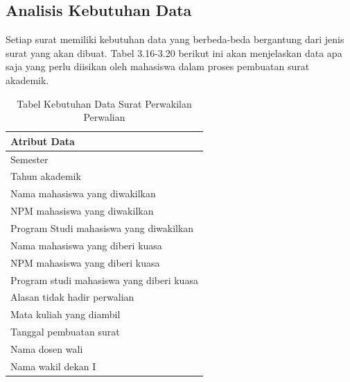\subsection{Analisis Kebutuhan Data}
\label{sec:analisis_kebutuhan_data}
Setiap surat memiliki kebutuhan data yang berbeda-beda bergantung dari jenis surat yang akan dibuat. Tabel 3.16-3.20 berikut ini akan menjelaskan data apa saja yang perlu diisikan oleh mahasiswa dalam proses pembuatan surat akademik.\
\begin{table}[H]
\centering
\caption{Tabel Kebutuhan Data Surat Perwakilan Perwalian}
\label{surat_perwakilan_perwalian}
\begin{tabular}{|l|}
\hline
\textbf{Atribut Data}                     \\ \hline
Semester            											\\ \hline
Tahun akademik								            \\ \hline
Nama mahasiswa yang diwakilkan            \\ \hline 
NPM mahasiswa yang diwakilkan             \\ \hline 
Program Studi mahasiswa yang diwakilkan   \\ \hline 
Nama mahasiswa yang diberi kuasa          \\ \hline 
NPM mahasiswa yang diberi kuasa           \\ \hline 
Program studi mahasiswa yang diberi kuasa \\ \hline 
Alasan tidak hadir perwalian               \\ \hline 
Mata kuliah yang diambil                  \\ \hline 
Tanggal pembuatan surat                   \\ \hline
Nama dosen wali								            \\ \hline
Nama wakil dekan I								        \\ \hline
\end{tabular}
\end{table}
\
